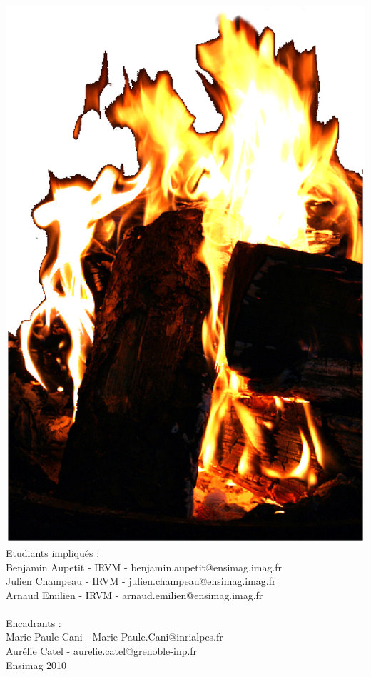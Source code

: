 \documentclass[a4paper,10pt]{article}
\begin{document}
\begin{center}
	\includegraphics[scale=0.3]{feu.ps}\\
	\vspace{2cm}
	Etudiants impliqués :\\
	Benjamin Aupetit - IRVM - benjamin.aupetit@ensimag.imag.fr\\
	Julien Champeau - IRVM - julien.champeau@ensimag.imag.fr\\
	Arnaud Emilien - IRVM - arnaud.emilien@ensimag.imag.fr\\
	~\\
	Encadrants :\\
	Marie-Paule Cani  -  Marie-Paule.Cani@inrialpes.fr \\
	Aurélie Catel - aurelie.catel@grenoble-inp.fr
	~ \\
	\vspace{3mm}
	Ensimag 2010\\

\end{center}
\end{document}
